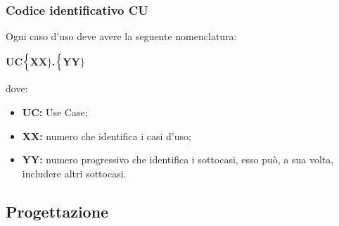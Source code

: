 \subsubsection{Codice identificativo CU}
Ogni caso d'uso deve avere la seguente nomenclatura:
\begin{center}
	\textbf{UC$\Bigl\{$XX$\Bigr\}$.$\Bigl\{$YY$\Bigr\}$}
\end{center}
dove:
\begin{itemize}
	\item \textbf{UC:} Use Case;
	\item \textbf{{XX}:} numero che identifica i casi d'uso;
	\item \textbf{{YY}:} numero progressivo che identifica i sottocasi, esso può, a sua volta, includere altri sottocasi.
\end{itemize}






\subsection{Progettazione} \label{progettazione}
